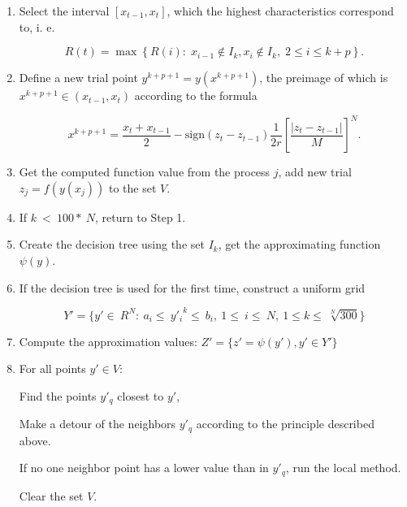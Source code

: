 \documentclass{svproc}
\begin{document}
\begin{enumerate}
	\item Select the interval $\left[x_{t-1},x_t\right]$, which the highest characteristics correspond to, i. e.
	
	\begin{displaymath} 
		R\left(t\right)=\max{\left\{R\left(i\right):\;x_{i-1}\notin I_k,x_i\notin I_k,\;2\le i\le k+p\right\}}. 
	\end{displaymath} 
	
	
	\item Define a new trial point $y^{k+p+1}=y\left(x^{k+p+1}\right)$, the preimage of which is  $x^{k+p+1}\in\left(x_{t-1},x_t\right)$ according to the formula 
	
\begin{displaymath}
	x^{k+p+1}=\frac{x_t+x_{t-1}}{2}-\mathrm{sign}\left(z_t-z_{t-1}\right)\frac{1}{2r}\left[\frac{\left|z_t-z_{t-1}\right|}{M}\right]^N.
\end{displaymath}
	
	
	\item Get the computed function value from the process $j$, add new trial $z_j = f(y(x_j))$ to the set  $V$. 
	
	
	\item If $k\ <\ 100\ast\ N$, return to Step 1.
	
	
	\item Create the decision tree using the set $I_k$, get the approximating function $\psi(y)$.
	
	\item If the decision tree is used for the first time, construct a uniform grid 
	
	\begin{displaymath} 
		Y'=\{ y'\in\ R^N:\ a_i\le\  {y'_i}^k \le\ b_i,\ 1\le\ i\le\ N,\ 1\le k\le\ \sqrt[N]{300}  \} 
	\end{displaymath} 
	
	
	\item Compute the approximation values: $Z' = \{ z'=  \psi(y'), y' \in Y'\}$
	
	\item For all points $y'\in V$:
	
	Find the points $y'_q$ closest to $y'$,
	
	Make a detour of the neighbors $y'_q$ according to the principle described above.
	
	If no one neighbor point has a lower value than in $y'_q$, run the local method.
	
	Clear the set $V$.
	
\end{enumerate}
\end{document}
